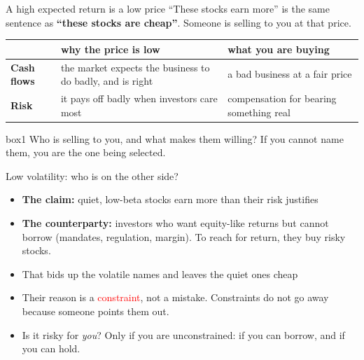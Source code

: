 \documentclass[aspectratio=169,10pt]{beamer}
\begin{document}
\begin{frame}{A high expected return is a low price}
``These stocks earn more'' is the same sentence as \textbf{``these stocks are cheap''}. Someone is selling to you at that price.
\vskip 8pt
\begin{center}
\renewcommand{\arraystretch}{1.6}
\begin{tabular}{l P{5.6cm} P{4.6cm}}
\toprule
 & why the price is low & what you are buying \\
\midrule
\textbf{Cash flows} & the market expects the business to do badly, and is right & a bad business at a fair price \\
\textbf{Risk} & it pays off badly when investors care most & compensation for bearing something real \\
\bottomrule
\end{tabular}
\end{center}
\vskip 8pt
\begin{beamercolorbox}[rounded=true,sep=7pt,center]{box1}
Who is selling to you, and what makes them willing? If you cannot name them, you are the one being selected.
\end{beamercolorbox}
\end{frame}

\begin{frame}{Low volatility: who is on the other side?}
\begin{itemize}
\item \textbf{The claim:} quiet, low-beta stocks earn more than their risk justifies
\vskip 10pt
\item \textbf{The counterparty:} investors who want equity-like returns but cannot borrow (mandates, regulation, margin). To reach for return, they buy risky stocks.
\vskip 10pt
\item That bids up the volatile names and leaves the quiet ones cheap
\vskip 10pt
\item Their reason is a \textcolor{red}{constraint}, not a mistake. Constraints do not go away because someone points them out.
\end{itemize}
\vskip 6pt
\begin{itemize}
\item Is it risky for \emph{you}? Only if you are unconstrained: if you can borrow, and if you can hold.
\end{itemize}
\end{frame}
\end{document}
